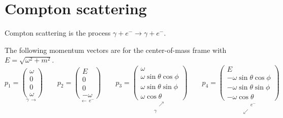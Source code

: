 

\section*{Compton scattering}

Compton scattering is the process $\gamma+e^-\rightarrow\gamma+e^-$.

\begin{center}
\end{center}

The following momentum vectors are for the center-of-mass frame with $E=\sqrt{\omega^2+m^2}$.
\begin{equation*}
p_1=\underset{\gamma \, \longrightarrow}
{\begin{pmatrix}\omega\\0\\0\\ \omega\end{pmatrix}}
\qquad
p_2=\underset{\longleftarrow \, e^-}
{\begin{pmatrix}E\\0\\0\\-\omega\end{pmatrix}}
\qquad
p_3=\underset{\substack{\phantom{\gamma} \, \nearrow\\\gamma \, \phantom{\nearrow}}}
{\begin{pmatrix}
\omega\\
\omega\sin\theta\cos\phi\\
\omega\sin\theta\sin\phi\\
\omega\cos\theta
\end{pmatrix}}
\qquad
p_4=\underset{\substack{\phantom{\swarrow} \, e^-\\\swarrow \, \phantom{e^-}}}
{\begin{pmatrix}
E\\
-\omega\sin\theta\cos\phi\\
-\omega\sin\theta\sin\phi\\
-\omega\cos\theta
\end{pmatrix}}
\end{equation*}


